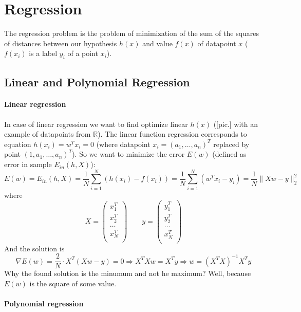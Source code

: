 \chapter{Regression}

{\sf The regression problem is the problem of minimization of the sum of the squares of distances between our hypothesis $h(x)$ and value $f(x)$ of datapoint $x$ ($f(x_i)$ is a label $y_i$ of a point $x_i$).}

\section{Linear and Polynomial Regression}
\vspace{-0.6cm}
\subsubsection*{Linear regression}

In case of linear regression we want to find optimize linear $h(x)$ ([pic.] with an example of datapoints from $\mathbb{R}$). The linear function regression corresponds to equation $h(x_i)=w^Tx_i=0$ (where datapoint $x_i=(a_1,\ldots,a_n)^T$ replaced by point $(1, a_1,\ldots,a_n)^T$). So we want to minimize the error $E(w)$ (defined as error in sample $E_{in}(h, X)$):
$$E(w)=E_{in}(h, X)=\frac{1}{N}\sum\limits_{i=1}^{N}(h(x_i)-f(x_i))=\frac{1}{N}\sum\limits_{i=1}^{N}(w^Tx_i-y_i)=\frac{1}{N}\|Xw-y\|_2^2$$
where
$$X=\begin{pmatrix}
	x_1^T \\
	x_2^T \\
	\ldots \\
	x_N^T \\
	\end{pmatrix} \qquad
	y=\begin{pmatrix}
	y_1^T \\
	y_2^T \\
	\ldots \\
	x_N^T \\
	\end{pmatrix}$$
And the solution is
$$\nabla E(w)=\frac{2}{N}\cdot X^T(Xw-y)=0\Rightarrow X^TXw=X^Ty\Rightarrow w=(X^TX)^{-1}X^Ty$$
Why the found solution is the minumum and not he maximum? Well, because $E(w)$ is the square of some value.

\subsubsection*{Polynomial regression}

